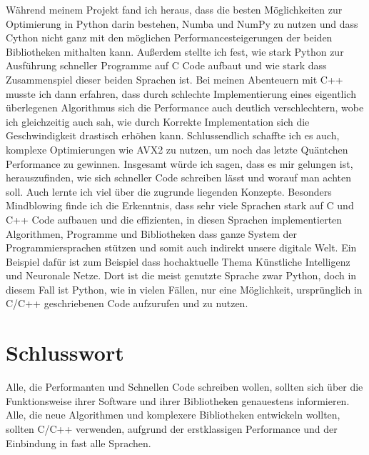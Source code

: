 \documentclass[12pt,a4paper]{article}
\begin{document}
Während meinem Projekt fand ich heraus, dass die besten Möglichkeiten zur Optimierung in Python darin bestehen,
Numba und NumPy zu nutzen und dass Cython nicht ganz mit den möglichen Performancesteigerungen der beiden Bibliotheken mithalten kann.
Außerdem stellte ich fest, wie stark Python zur Ausführung schneller Programme auf C Code aufbaut und wie stark dass Zusammenspiel dieser
beiden Sprachen ist.
Bei meinen Abenteuern mit C++ musste ich dann erfahren, dass durch schlechte Implementierung eines eigentlich überlegenen Algorithmus sich die
Performance auch deutlich verschlechtern, wobe ich gleichzeitig auch sah, wie durch Korrekte Implementation sich die Geschwindigkeit drastisch
erhöhen kann. Schlussendlich schaffte ich es auch, komplexe Optimierungen wie AVX2 zu nutzen, um noch das letzte Quäntchen Performance zu gewinnen.
Insgesamt würde ich sagen, dass es mir gelungen ist, herauszufinden, wie sich schneller Code schreiben lässt und worauf man achten soll.
Auch lernte ich viel über die zugrunde liegenden Konzepte.
Besonders Mindblowing finde ich die Erkenntnis, dass sehr viele Sprachen stark auf C und C++ Code aufbauen
und die effizienten, in diesen Sprachen implementierten Algorithmen, Programme und Bibliotheken dass ganze System
der Programmiersprachen stützen und somit auch indirekt unsere digitale Welt.
Ein Beispiel dafür ist zum Beispiel dass hochaktuelle Thema Künstliche Intelligenz und Neuronale Netze.
Dort ist die meist genutzte Sprache zwar Python, doch in diesem Fall ist Python, wie in vielen Fällen, nur
eine Möglichkeit, ursprünglich in C/C++ geschriebenen Code aufzurufen und zu nutzen.

\section{Schlusswort}

Alle, die Performanten und Schnellen Code schreiben wollen, sollten sich über die Funktionsweise ihrer 
Software und ihrer Bibliotheken genauestens informieren.
Alle, die neue Algorithmen und komplexere Bibliotheken entwickeln wollten, sollten C/C++
verwenden, aufgrund der erstklassigen Performance und der Einbindung in fast alle Sprachen.

\clearpage

\printbibliography[title={Literaturverzeichnis}]
\end{document}
